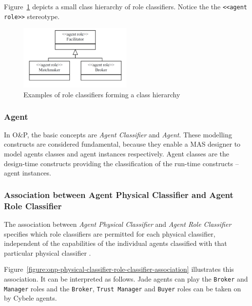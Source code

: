 Figure~\ref{figure:onp-role-classifier-examples} depicts a small class hierarchy of role classifiers.
Notice the the \texttt{<<agent role>>} stereotype.

\begin{figure}[ht]
	\centering
	\includegraphics[width=0.5\textwidth]{images/onp/role-classifier-examples.png}
	\caption{Examples of role classifiers forming a class hierarchy \cite{Odell05}}
	\label{figure:onp-role-classifier-examples}
\end{figure}

\subsubsection*{Agent}

In O\&P, the basic concepts are \textit{Agent Classifier} and \textit{Agent}.
These modelling constructs are considered fundamental, because they enable a MAS designer to model agents classes and agent instances respectively.
Agent classes are the design-time constructs providing the classification of the run-time constructs -- agent instances.

\subsubsection*{Association between Agent Physical Classifier and Agent Role Classifier}

The association between \textit{Agent Physical Classifier} and \textit{Agent Role Classifier} specifies which role classifiers are permitted for each physical classifier, independent of the capabilities of the individual agents classified with that particular physical classifier \cite{Odell05}.

Figure~\ref{figure:onp-physical-classifier-role-classifier-association} illustrates this association.
It can be interpreted as follows. Jade agents can play the \texttt{Broker} and \texttt{Manager} roles and the \texttt{Broker}, \texttt{Trust Manager} and \texttt{Buyer} roles can be taken on by Cybele agents.

